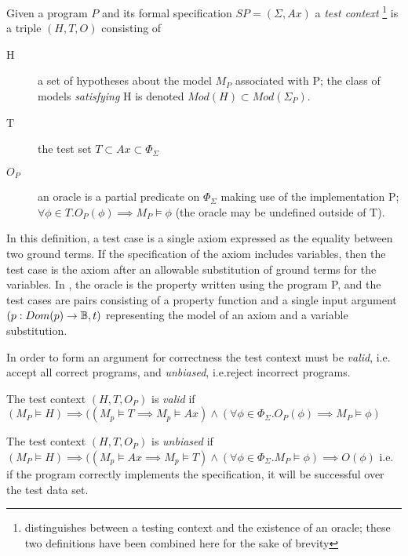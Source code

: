 {\begin{df}
Given a program $P$ and its formal specification $SP = (\Sigma, Ax)$ 
a \emph{test context}
\footnote{\cite{Bernot1991} distinguishes between 
a testing context and the existence of an oracle;
these two definitions have been combined here for the sake of brevity}
is a triple $(H, T, O)$ consisting of

\begin{description}
\item[H] { a set of hypotheses about the model $M_P$ associated with P;
the class of models \emph{satisfying} H is denoted $Mod(H) \subset Mod(\Sigma_P)$.
}
\item[T] {the test set $T \subset Ax \subset \Phi_\Sigma$}
\item[$O_P$] {an oracle is a partial predicate on $\Phi_\Sigma$ making use of the implementation P;
$\forall \phi \in T. O_P(\phi) \implies M_P \models \phi$ 
(the oracle may be undefined outside of T).
} 
\end{description}
\end{df}

\noindent
In this definition, a test case is a single axiom expressed
as the equality between two ground terms.
If the specification of the axiom includes variables,
then the test case is the axiom after an allowable substitution of ground terms for the variables.
In \pbt, the oracle is the property written using the program P,
and the test cases are pairs consisting of 
a property function and a single input argument
$(p: Dom(p) \rightarrow \mathbb{B}, t)$ 
representing the model of an axiom and a variable substitution.

In order to form an argument for correctness
the test context must be \emph{valid},
i.e. accept all correct programs,
and \emph{unbiased}, i.e.reject incorrect programs.

\begin{df}
The test context $(H,T,O_P)$ is \emph{valid} if 
$(M_P \models H) \implies ( (M_p \models T \implies M_p \models Ax) \land
(\forall \phi \in \Phi_\Sigma. O_P(\phi) \implies M_P \models \phi)$
\end{df}

\begin{df}
The test  context $(H,T,O_P)$ is \emph{unbiased} if 
$(M_P \models H) \implies ( (M_p \models Ax \implies M_p \models T)
\land (\forall \phi \in \Phi_\Sigma. M_P \models \phi) \implies O(\phi)$
i.e. if the program correctly implements the specification, 
it will be successful over the test data set.
\end{df}

}
